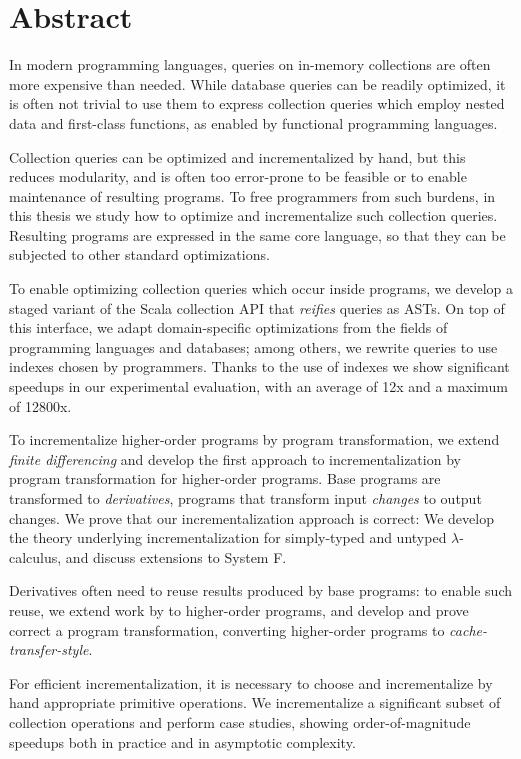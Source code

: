 \chapter{Abstract}

In modern programming languages, queries on in-memory collections are often more
expensive than needed.
While database queries can be readily optimized, it is often not trivial to use
them to express collection queries which employ nested data and first-class
functions, as enabled by functional programming languages.

Collection queries can be optimized and incrementalized by hand, but this
reduces modularity, and is often too error-prone to be feasible or to enable
maintenance of resulting programs. To free programmers from such burdens,
in this thesis we study how to optimize and incrementalize such collection queries.
Resulting programs are expressed in the same core language, so that they can be
subjected to other standard optimizations.

To enable optimizing collection queries which occur inside programs, we develop a
staged variant of the Scala collection API that \emph{reifies} queries as ASTs.
On top of this interface, we adapt domain-specific optimizations from the fields
of programming languages and databases; among others, we rewrite queries to use
indexes chosen by programmers. Thanks to the use of indexes we show significant
speedups in our experimental evaluation, with an average of 12x and a maximum of
12800x.

To incrementalize higher-order programs by program transformation, we extend
\emph{finite differencing} \citep{Paige82FDC,Blakeley:1986:EUM,Gupta99MMV} and
develop the first approach to incrementalization by program transformation for
higher-order programs. Base programs are transformed to \emph{derivatives},
programs that transform input \emph{changes} to output changes.
We prove that our incrementalization approach is correct: We develop the theory
underlying incrementalization for simply-typed and untyped $\lambda$-calculus, and
discuss extensions to System F\@.

Derivatives often need to reuse results produced by base programs: to enable
such reuse, we extend work by \citet{Liu95} to higher-order programs, and
develop and prove correct a program transformation, converting higher-order
programs to \emph{cache-transfer-style}.

For efficient incrementalization, it is necessary to choose and incrementalize
by hand appropriate primitive operations. We incrementalize a significant subset
of collection operations and perform case studies, showing order-of-magnitude speedups
both in practice and in asymptotic complexity.

